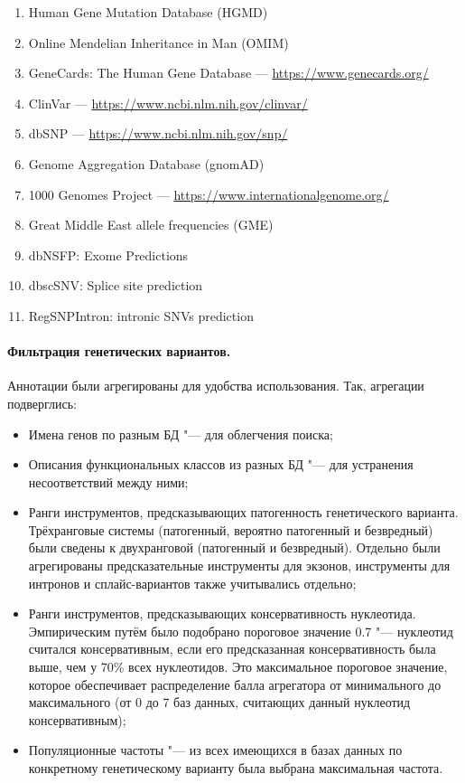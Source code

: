 \documentclass[a4paper,12pt]{article}
\begin{document}
\begin{enumerate}
\item Human Gene Mutation Database (HGMD\textregistered)\cite{hgmd}
\item Online Mendelian Inheritance in Man (OMIM\textregistered)\cite{omim}
\item GeneCards\textregistered: The Human Gene Database --- \href{https://www.genecards.org/}{https://www.genecards.org/}
\item ClinVar --- \href{https://www.ncbi.nlm.nih.gov/clinvar/}{https://www.ncbi.nlm.nih.gov/clinvar/}
\item dbSNP --- \href{https://www.ncbi.nlm.nih.gov/snp/}{https://www.ncbi.nlm.nih.gov/snp/}
\item Genome Aggregation Database (gnomAD)\cite{gnomad}
\item 1000 Genomes Project --- \href{https://www.internationalgenome.org/}{https://www.internationalgenome.org/}
\item Great Middle East allele frequencies (GME)\cite{gme}
\item dbNSFP: Exome Predictions\cite{dbnsfp}
\item dbscSNV: Splice site prediction\cite{dbscsnv}
\item RegSNPIntron: intronic SNVs prediction\cite{regsnpintron}
\end{enumerate}

\paragraph{Фильтрация генетических вариантов.}
Аннотации были агрегированы для удобства использования.
Так, агрегации подверглись:

\begin{itemize}
\item Имена генов по разным БД "--- для облегчения поиска;
\item Описания функциональных классов из разных БД "--- для устранения несоответствий между ними;
\item Ранги инструментов, предсказывающих патогенность генетического варианта.
Трёхранговые системы (патогенный, вероятно патогенный и безвредный) были сведены к двухранговой (патогенный и безвредный).
Отдельно были агрегированы предсказательные инструменты для экзонов, инструменты для интронов и сплайс-вариантов также учитывались отдельно;
\item Ранги инструментов, предсказывающих консервативность нуклеотида.
Эмпирическим путём было подобрано пороговое значение 0.7 "--- нуклеотид считался консервативным, если его предсказанная консервативность была выше, чем у 70\% всех нуклеотидов.
Это максимальное пороговое значение, которое обеспечивает распределение балла агрегатора от минимального до максимального (от 0 до 7 баз данных, считающих данный нуклеотид консервативным);
\item Популяционные частоты "--- из всех имеющихся в базах данных по конкретному генетическому варианту была выбрана максимальная частота.
\end{itemize}
\end{document}
